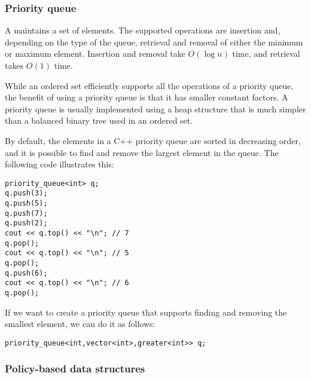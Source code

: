 \subsubsection{Priority queue}


A 
maintains a set of elements.
The supported operations are insertion and,
depending on the type of the queue,
retrieval and removal of
either the minimum or maximum element.
Insertion and removal take $O(\log n)$ time,
and retrieval takes $O(1)$ time.

While an ordered set efficiently supports
all the operations of a priority queue,
the benefit of using a priority queue is
that it has smaller constant factors.
A priority queue is usually implemented using
a heap structure that is much simpler than a
balanced binary tree used in an ordered set.

\begin{samepage}
By default, the elements in a C++
priority queue are sorted in decreasing order,
and it is possible to find and remove the
largest element in the queue.
The following code illustrates this:

\begin{lstlisting}
priority_queue<int> q;
q.push(3);
q.push(5);
q.push(7);
q.push(2);
cout << q.top() << "\n"; // 7
q.pop();
cout << q.top() << "\n"; // 5
q.pop();
q.push(6);
cout << q.top() << "\n"; // 6
q.pop();
\end{lstlisting}
\end{samepage}

If we want to create a priority queue
that supports finding and removing
the smallest element,
we can do it as follows:

\begin{lstlisting}
priority_queue<int,vector<int>,greater<int>> q;
\end{lstlisting}

\subsubsection{Policy-based data structures}

